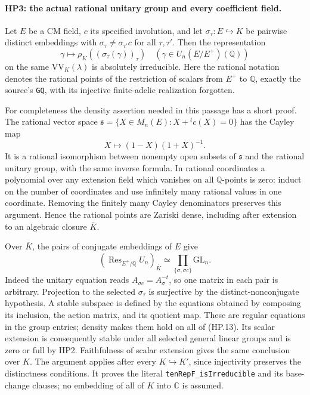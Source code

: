\paragraph{HP3: the actual rational unitary group and every coefficient field.}
\label{claim:HP3}
Let $E$ be a CM field, $c$ its specified involution, and let
$\sigma_\tau:E\hookrightarrow K$ be pairwise distinct embeddings
with $\sigma_\tau\ne\sigma_{\tau'}c$ for all $\tau,\tau'$.
Then the representation
\[
 \gamma\longmapsto
   \rho_K((\sigma_\tau(\gamma))_\tau)
       \quad(\gamma\in U_n(E/E^+)(\mathbb Q))          \tag{HP.11}
\]
on the same $\mathrm{VV}_K(\lambda)$ is absolutely irreducible.
Here the rational notation denotes the rational points of the
restriction of scalars from $E^+$ to $\mathbb Q$, exactly the source's
\texttt{GQ}, with its injective finite-adelic realization forgotten.

For completeness the density assertion needed in this passage has a
short proof.  The rational vector space
$\mathfrak s=\{X\in M_n(E):X+{}^t c(X)=0\}$ has the Cayley map
\[
                 X\longmapsto(1-X)(1+X)^{-1}.        \tag{HP.12}
\]
It is a rational isomorphism between nonempty open subsets of
$\mathfrak s$ and the rational unitary group, with the same inverse
formula.  In rational coordinates a polynomial over any extension
field which vanishes on all $\mathbb Q$-points is zero: induct on the
number of coordinates and use infinitely many rational values in one
coordinate.  Removing the finitely many Cayley denominators preserves
this argument.  Hence the rational points are Zariski dense, including
after extension to an algebraic closure $\overline K$.

Over $\overline K$, the pairs of conjugate embeddings of $E$ give
\[
 (\operatorname{Res}_{E^+/\mathbb Q}U_n)_{\overline K}
                \simeq\prod_{\{\sigma,\sigma c\}}\mathrm{GL}_n.
 \tag{HP.13}
\]
Indeed the unitary equation reads $A_{\sigma c}=A_\sigma^{-t}$,
so one matrix in each pair is arbitrary.  Projection to the selected
$\sigma_\tau$ is surjective by the distinct-nonconjugate hypothesis.
A stable subspace is defined by the equations obtained by composing
its inclusion, the action matrix, and its quotient map.  These are
regular equations in the group entries; density makes them hold on
all of (HP.13).  Its scalar extension is consequently stable under
all selected general linear groups and is zero or full by HP2.
Faithfulness of scalar extension gives the same conclusion over $K$.
The argument applies after every $K\hookrightarrow K'$, since
injectivity preserves the distinctness conditions.  It proves the
literal \texttt{tenRepF\_isIrreducible} and its base-change clauses;
no embedding of all of $K$ into $\mathbb C$ is assumed.

